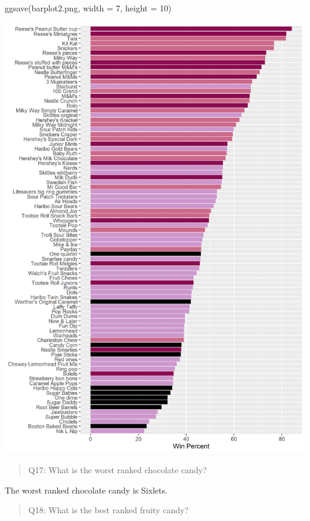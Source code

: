 \documentclass[
  letterpaper,
  DIV=11,
  numbers=noendperiod]{scrartcl}
\newenvironment{Shaded}{\begin{snugshade}}{\end{snugshade}}
\newcommand{\AttributeTok}[1]{\textcolor[rgb]{0.40,0.45,0.13}{#1}}
\newcommand{\DecValTok}[1]{\textcolor[rgb]{0.68,0.00,0.00}{#1}}
\newcommand{\FunctionTok}[1]{\textcolor[rgb]{0.28,0.35,0.67}{#1}}
\newcommand{\NormalTok}[1]{\textcolor[rgb]{0.00,0.23,0.31}{#1}}
\newcommand{\StringTok}[1]{\textcolor[rgb]{0.13,0.47,0.30}{#1}}
\begin{document}
\begin{Shaded}
\begin{Highlighting}[]
\FunctionTok{ggsave}\NormalTok{(}\StringTok{\textquotesingle{}barplot2.png\textquotesingle{}}\NormalTok{, }\AttributeTok{width =} \DecValTok{7}\NormalTok{, }\AttributeTok{height =} \DecValTok{10}\NormalTok{)}
\end{Highlighting}
\end{Shaded}

\includegraphics{barplot2.png}

\begin{quote}
Q17: What is the worst ranked chocolate candy?
\end{quote}

The worst ranked chocolate candy is Sixlets.

\begin{quote}
Q18: What is the best ranked fruity candy?
\end{quote}
\end{document}
